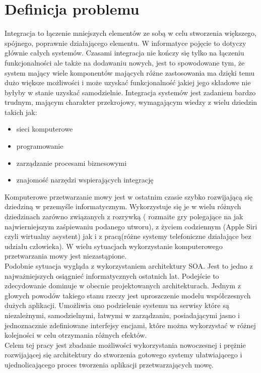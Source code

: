 \section{Definicja problemu } %
Integracja to łączenie mniejszych elementów ze sobą w celu stworzenia większego, spójnego, poprawnie działającego elementu. W informatyce pojęcie to dotyczy głównie całych systemów. Czasami integracja nie kończy się tylko na łączeniu funkcjonalności ale także na dodawaniu nowych, jest to spowodowane tym, że system mający wiele komponentów mających różne zastosowania ma dzięki temu dużo większe możliwości i może uzyskać funkcjonalność jakiej jego składowe nie byłyby w stanie uzyskać samodzielnie. Integracja systemów jest zadaniem bardzo trudnym, mającym charakter przekrojowy, wymagającym wiedzy z wielu dziedzin takich jak:
 \begin{itemize}
	\item sieci komputerowe
	\item programowanie
	\item zarządzanie procesami biznesowymi
	\item znajomość narzędzi wspierających integrację
\end{itemize} 
Komputerowe przetwarzanie mowy jest w ostatnim czasie szybko rozwijającą się dziedziną w przemyśle informatycznym. Wykorzystuje się je w wielu różnych dziedzinach zarówno związanych z rozrywką ( rozmaite gry polegające na jak najwierniejszym zaśpiewaniu podanego utworu), z życiem codziennym (Apple Siri czyli wirtualny asystent) jak i z pracą(różne systemy telefoniczne działające bez udziału człowieka). W wielu sytuacjach wykorzystanie komputerowego przetwarzania mowy jest niezastąpione.\\
Podobnie sytuacja wygląda z wykorzystaniem architektury SOA. Jest to jedno z najważniejszych osiągnieć informatycznych ostatnich lat. Podejście to zdecydowanie dominuje w obecnie projektowanych architekturach. Jednym z głowych powodów takiego stanu rzeczy jest uproszczenie modelu współczesnych dużych aplikacji. Umożliwia ono podzielenie systemu na serwisy które są niezależnymi, samodzielnymi, łatwymi w zarządzaniu, posiadającymi jasno i jednoznacznie zdefiniowane interfejsy encjami, które można wykorzystać w różnej kolejności w celu otrzymania różnych efektów. \\
Celem tej pracy jest zbadanie możliwości wykorzystania nowoczesnej i prężnie rozwijającej się architektury do stworzenia gotowego systemy ułatwiającego i ujednolicającego proces tworzenia aplikacji przetwarzających mowę.
 


